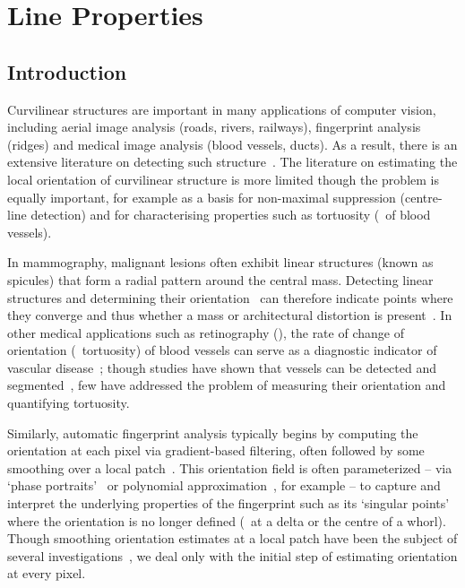 \chapter{Line Properties}

\section{Introduction}
\label{s:introduction}
Curvilinear structures are important in many applications of computer vision, including aerial image analysis (roads, rivers, railways), fingerprint analysis (ridges) and medical image analysis (blood vessels, ducts). As a result, there is an extensive literature on detecting such structure~\cite{Papari_Petkov_IVC11}. The literature on estimating the local orientation of curvilinear structure is more limited though the problem is equally important, for example as a basis for non-maximal suppression (centre-line detection) and for characterising properties such as tortuosity (\eg~of blood vessels).

In mammography, malignant lesions often exhibit linear structures (known as spicules) that form a radial pattern around the central mass. Detecting linear structures and determining their orientation~\cite{Zwiggelaar_etal_MIA99,Zwiggelaar_etal_TMI04} can therefore indicate points where they converge and thus whether a mass or architectural distortion is present~\cite{Karssemeijer_teBrake_TMI96,Rangayyan_Ayres_MBEC06}. In other medical applications such as retinography (), the rate of change of orientation (\ie~tortuosity) of blood vessels can serve as a diagnostic indicator of vascular disease~\cite{Hart_etal_IJMI99}; though studies have shown that vessels can be detected and segmented~\cite{Staal_etal_TMI04,Ricci_Perfetti_TMI07,Dabbah_etal_MICCAI10}, few have addressed the problem of measuring their orientation and quantifying tortuosity.

Similarly, automatic fingerprint analysis typically begins by computing the orientation at each pixel via gradient-based filtering, often followed by some smoothing over a local patch~\cite{Bazen_Gerez_TPAMI02,Mei_etal_IVC09}. This orientation field is often parameterized -- via `phase portraits'~\cite{Li_etal_PR06} or polynomial approximation~\cite{Gu_etal_PR04}, for example -- to capture and interpret the underlying properties of the fingerprint such as its `singular points' where the orientation is no longer defined (\eg~at a delta or the centre of a whorl). Though smoothing orientation estimates at a local patch have been the subject of several investigations~\cite{Kass_Witkin_CVGIP87,Rao_Jain_TPAMI92,Perona_TIP98}, we deal only with the initial step of estimating orientation at every pixel.

